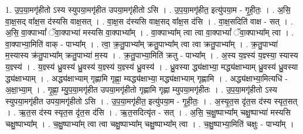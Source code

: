 \documentclass[17pt]{extarticle}
\begin{document}
1. उ॒प॒या॒मगृ॑हीतो ऽस्य स्युपया॒मगृ॑हीत उपया॒मगृ॑हीतो ऽसि । . उ॒प॒या॒मगृ॑हीत॒ इत्यु॑पया॒म - गृ॒ही॒तः॒ । . अ॒सि॒ वा॒क्ष॒सद् वा᳚क्ष॒स द॑स्यसि वाक्ष॒सत् । . वा॒क्ष॒स द॑स्यसि वाक्ष॒सद् वा᳚क्ष॒स द॑सि । . वा॒क्ष॒सदिति॑ वाक्ष - सत् । . अ॒सि॒ वा॒क्पाभ्यां᳚ ॅवा॒क्पाभ्या॑ मस्यसि वा॒क्पाभ्या᳚म् । . वा॒क्पाभ्या᳚म् त्वा त्वा वा॒क्पाभ्यां᳚ ॅवा॒क्पाभ्या᳚म् त्वा । . वा॒क्पाभ्या॒मिति॑ वाक् - पाभ्या᳚म् । . त्वा॒ क्र॒तु॒पाभ्या᳚म् क्रतु॒पाभ्या᳚म् त्वा त्वा क्रतु॒पाभ्या᳚म् । . क्र॒तु॒पाभ्या॑ म॒स्यास्य क्र॑तु॒पाभ्या᳚म् क्रतु॒पाभ्या॑ म॒स्य । . क्र॒तु॒पाभ्या॒मिति॑ क्रतु - पाभ्या᳚म् । . अ॒स्य य॒ज्ञ्स्य॑ य॒ज्ञ्स्या॒ स्यास्य य॒ज्ञ्स्य॑ । . य॒ज्ञ्स्य॑ ध्रु॒वस्य॑ ध्रु॒वस्य॑ य॒ज्ञ्स्य॑ य॒ज्ञ्स्य॑ ध्रु॒वस्य॑ । . ध्रु॒वस्या द्ध्य॑क्षाभ्या॒ मद्ध्य॑क्षाभ्याम् ध्रु॒वस्य॑ ध्रु॒वस्या द्ध्य॑क्षाभ्याम् । . अद्ध्य॑क्षाभ्याम् गृह्णामि गृह्णा॒ म्यद्ध्य॑क्षाभ्या॒ मद्ध्य॑क्षाभ्याम् गृह्णामि । . अद्ध्य॑क्षाभ्या॒मित्यधि॑ - अ॒क्षा॒भ्या॒म् । . गृ॒ह्णा॒ म्यु॒प॒या॒मगृ॑हीत उपया॒मगृ॑हीतो गृह्णामि गृह्णा म्युपया॒मगृ॑हीतः । . उ॒प॒या॒मगृ॑हीतो ऽस्य स्युपया॒मगृ॑हीत उपया॒मगृ॑हीतो ऽसि । . उ॒प॒या॒मगृ॑हीत॒ इत्यु॑पया॒म - गृ॒ही॒तः॒ । . अ॒स्यृ॒त॒स दृ॑त॒स द॑स्य स्यृत॒सत् । . ऋ॒त॒स द॑स्य स्यृत॒स दृ॑त॒स द॑सि । . ऋ॒त॒सदित्यृ॑त - सत् । . अ॒सि॒ च॒क्षु॒ष्पाभ्या᳚म् चक्षु॒ष्पाभ्या॑ मस्यसि चक्षु॒ष्पाभ्या᳚म् । . च॒क्षु॒ष्पाभ्या᳚म् त्वा त्वा चक्षु॒ष्पाभ्या᳚म् चक्षु॒ष्पाभ्या᳚म् त्वा । . च॒क्षु॒ष्पाभ्या॒मिति॑ चक्षुः - पाभ्या᳚म् । \newline
\end{document}
